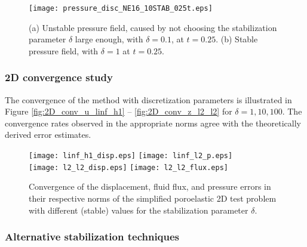 \begin{figure}[H]
\begin{center}
\subfloat[]{\label{fig:stable}}  {\texttt{[image: pressure\_disc\_NE16\_10STAB\_025t.eps]}}
\caption{(a) Unstable pressure field, caused by not choosing the stabilization parameter $\delta$ large enough, with $\delta=0.1$, at $t=0.25$. (b) Stable pressure field, with $\delta=1$ at $t=0.25$.}
\end{center}
\end{figure}




\subsubsection{2D convergence study}
The convergence of the method with discretization parameters is illustrated in Figure \ref{fig:2D_conv_u_linf_h1} -- \ref{fig:2D_conv_z_l2_l2}  for $\delta=1,10,100$. The convergence rates observed in the appropriate norms agree with the theoretically derived error estimates. %

\begin{figure}[H]
\begin{center}
  \subfloat[]{\label{fig:2D_conv_u_linf_h1}} {\texttt{[image: linf\_h1\_disp.eps]}}
  \subfloat[]{\label{fig:2D_conv_p_linf_l2}} {\texttt{[image: linf\_l2\_p.eps]}}\\
  \subfloat[]{\label{fig:2D_conv_u_l2_l2}}   {\texttt{[image: l2\_l2\_disp.eps]}}
  \subfloat[]{\label{fig:2D_conv_z_l2_l2}}   {\texttt{[image: l2\_l2\_flux.eps]}}
\caption{Convergence of the displacement, fluid flux, and pressure errors in their respective norms of the simplified poroelastic 2D test problem with different (stable) values for the stabilization parameter $ \delta$.}
\end{center}
\end{figure}

\subsubsection{Alternative stabilization techniques}

